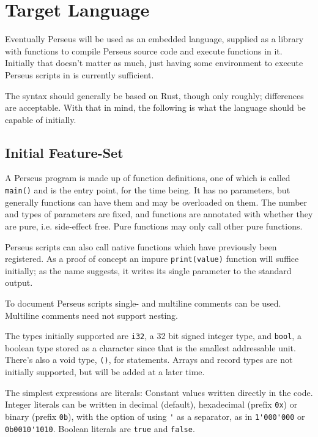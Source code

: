     \section{Target Language}
    
    	Eventually Perseus will be used as an embedded language, supplied as a library with functions to compile Perseus source code and execute functions in it. Initially that doesn't matter as much, just having some environment to execute Perseus scripts in is currently sufficient.
    	
    	The syntax should generally be based on Rust\cite{rust}, though only roughly; differences are acceptable. With that in mind, the following is what the language should be capable of initially.
    	
    	\subsection{Initial Feature-Set}
    	
			A Perseus program is made up of function definitions, one of which is called \lstinline$main()$ and is the entry point, for the time being. It has no parameters, but generally functions can have them and may be overloaded on them. The number and types of parameters are fixed, and functions are annotated with whether they are pure, i.e. side-effect free. Pure functions may only call other pure functions.
			
			Perseus scripts can also call native functions which have previously been registered. As a proof of concept an impure \lstinline$print(value)$ function will suffice initially; as the name suggests, it writes its single parameter to the standard output.
			
			To document Perseus scripts single- and multiline comments can be used. Multiline comments need not support nesting.
			
			The types initially supported are \lstinline$i32$, a 32 bit signed integer type, and \lstinline$bool$, a boolean type stored as a character since that is the smallest addressable unit. There's also a void type, \lstinline$()$, for statements. Arrays and record types are not initially supported, but will be added at a later time.
	    	
	    	The simplest expressions are literals: Constant values written directly in the code. Integer literals can be written in decimal (default), hexadecimal (prefix \lstinline$0x$) or binary (prefix \lstinline$0b$), with the option of using \lstinline$'$ as a separator, as in \lstinline$1'000'000$ or \lstinline$0b0010'1010$. Boolean literals are \lstinline$true$ and \lstinline$false$.
	    	
